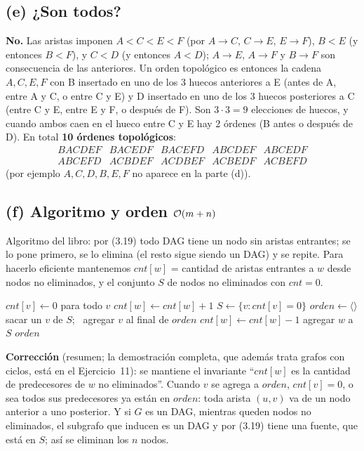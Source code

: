 \subsection*{(e) ¿Son todos?}
\textbf{No.} Las aristas imponen $A<C<E<F$ (por $A\to C$, $C\to E$, $E\to F$), $B<E$ (y entonces
$B<F$), y $C<D$ (y entonces $A<D$); $A\to E$, $A\to F$ y $B\to F$ son consecuencia de las anteriores. Un
orden topológico es entonces la cadena $A,C,E,F$ con B insertado en uno de los 3 huecos anteriores a E
(antes de A, entre A y C, o entre C y E) y D insertado en uno de los 3 huecos posteriores a C (entre C y
E, entre E y F, o después de F). Son $3\cdot3=9$ elecciones de huecos, y cuando ambos caen en el hueco
entre C y E hay 2 órdenes (B antes o después de D). En total \textbf{10 órdenes topológicos}:
\[
\begin{array}{lllll}
BACDEF & BACEDF & BACEFD & ABCDEF & ABCEDF\\
ABCEFD & ACBDEF & ACDBEF & ACBEDF & ACBEFD
\end{array}
\]
(por ejemplo $A,C,D,B,E,F$ no aparece en la parte (d)).

\subsection*{(f) Algoritmo y orden $\mathcal{O}(m+n)$}
Algoritmo del libro: por (3.19) todo DAG tiene un nodo sin aristas entrantes; se lo pone primero, se lo
elimina (el resto sigue siendo un DAG) y se repite. Para hacerlo eficiente mantenemos $cnt[w]$ = cantidad
de aristas entrantes a $w$ desde nodos no eliminados, y el conjunto $S$ de nodos no eliminados con
$cnt=0$.

\begin{algorithm}[H]
\caption{Orden topológico por eliminación de fuentes}
\begin{algorithmic}[1]
 
  \State $cnt[v]\gets0$ para todo $v$
   \State $cnt[w]\gets cnt[w]+1$ \EndFor
  \State $S\gets\{v: cnt[v]=0\}$ 
  \State $orden\gets\langle\rangle$
    \State sacar un $v$ de $S$; \ agregar $v$ al final de $orden$
     
      \State $cnt[w]\gets cnt[w]-1$
       agregar $w$ a $S$ \EndIf
    \EndFor
  \EndWhile
  \State \Return $orden$
\EndFunction
\end{algorithmic}
\end{algorithm}

\textbf{Corrección} (resumen; la demostración completa, que además trata grafos con ciclos, está en el
Ejercicio~11): se mantiene el invariante ``$cnt[w]$ es la cantidad de predecesores de $w$ no
eliminados''. Cuando $v$ se agrega a $orden$, $cnt[v]=0$, o sea todos sus predecesores ya están en
$orden$: toda arista $(u,v)$ va de un nodo anterior a uno posterior. Y si $G$ es un DAG, mientras queden
nodos no eliminados, el subgrafo que inducen es un DAG y por (3.19) tiene una fuente, que está en $S$;
así se eliminan los $n$ nodos.

